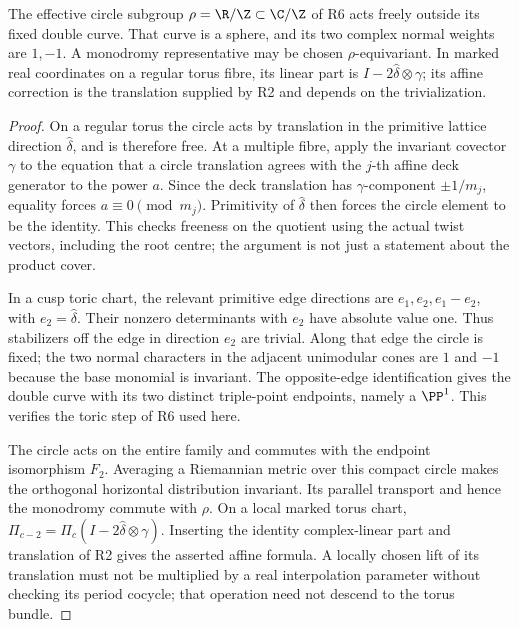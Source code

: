 \begin{proposition}
The effective circle subgroup $\rho=\R/\Z\subset\C/\Z$ of R6
acts freely outside its fixed double curve. That curve is a sphere,
and its two complex normal weights are $1,-1$. A monodromy
representative may be chosen $\rho$-equivariant. In marked real
coordinates on a regular torus fibre, its linear part is
$I-2\widehat\delta\otimes\gamma$; its affine correction is the
translation supplied by R2 and depends on the trivialization.
\end{proposition}

\begin{proof}
On a regular torus the circle acts by translation in the primitive
lattice direction $\widehat\delta$, and is therefore free.
At a multiple fibre, apply the invariant covector $\gamma$ to the
equation that a circle translation agrees with the $j$-th affine
deck generator to the power $a$. Since the deck translation has
$\gamma$-component $\pm1/m_j$, equality forces
$a\equiv0\pmod{m_j}$. Primitivity of $\widehat\delta$ then
forces the circle element to be the identity. This checks freeness
on the quotient using the actual twist vectors, including the root
centre; the argument is not just a statement about the product cover.

In a cusp toric chart, the relevant primitive edge directions are
$e_1,e_2,e_1-e_2$, with $e_2=\widehat\delta$.
Their nonzero determinants with $e_2$ have absolute value one.
Thus stabilizers off the edge in direction $e_2$ are trivial. Along
that edge the circle is fixed; the two normal characters in the
adjacent unimodular cones are $1$ and $-1$ because the base monomial
is invariant. The opposite-edge identification gives the double
curve with its two distinct triple-point endpoints, namely a
$\PP^1$. This verifies the toric step of R6 used here.

The circle acts on the entire family and commutes with the endpoint
isomorphism $F_2$. Averaging a Riemannian metric over this compact
circle makes the orthogonal horizontal distribution invariant.
Its parallel transport and hence the monodromy commute with $\rho$.
On a local marked torus chart,
$\Pi_{c-2}=\Pi_c(I-2\widehat\delta\otimes\gamma)$.
Inserting the identity complex-linear part and translation of R2
gives the asserted affine formula. A locally chosen lift of its
translation must not be multiplied by a real interpolation parameter
without checking its period cocycle; that operation need not descend
to the torus bundle.
\end{proof}

